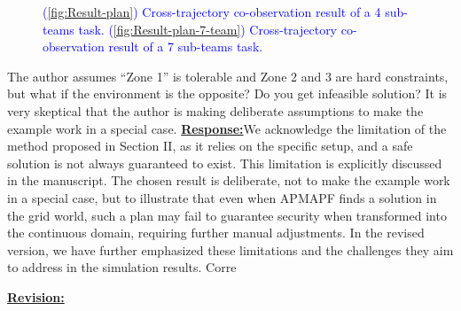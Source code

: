 \documentclass{article}
\newcommand{\re}{\tcblower \underline{\textbf{Response:}}}
\newcommand{\rv}{{\Large{\underline{\textbf{Revision:}}}}\quad}
\newcommand{\new}[1]{\textcolor{blue}{#1}}
\begin{document}
  \begin{figure}[H]
	\centering
	\caption{\new{(\ref{fig:Result-plan}) Cross-trajectory co-observation result of a 4 sub-teams task. (\ref{fig:Result-plan-7-team}) Cross-trajectory co-observation result of a 7 sub-teams task.}}\label{fig:Cross-trajectory-result}
  \end{figure}
\vspace{0.2cm}

\begin{cmt}{}{}
	The author assumes “Zone 1” is tolerable and Zone 2 and 3 are hard
constraints, but what if the environment is the opposite? Do you get
infeasible solution? It is very skeptical that the author is making
deliberate assumptions to make the example work in a special case.
\re We acknowledge the limitation of the method proposed in Section II, as it relies on the specific setup, and a safe solution is not always guaranteed to exist. This limitation is explicitly discussed in the manuscript. The chosen result is deliberate, not to make the example work in a special case, but to illustrate that even when APMAPF finds a solution in the grid world, such a plan may fail to guarantee security when transformed into the continuous domain, requiring further manual adjustments. In the revised version, we have further emphasized these limitations and the challenges they aim to address in the simulation results.
Corre
\end{cmt}
\vspace{0.1cm}
\rv
\renewcommand\thesubsection{H}
\end{document}
